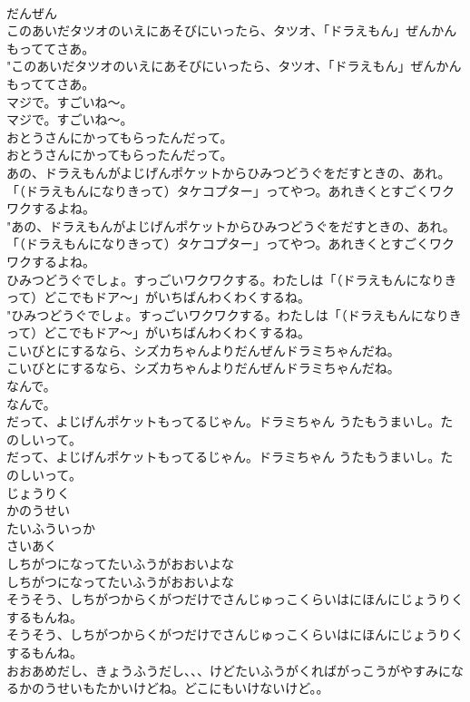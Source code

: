 \documentclass[8pt]{extreport}
\begin{document}
\begin{CJK}{UTF8}{min}
\\	だんぜん
\\	このあいだタツオのいえにあそびにいったら、タツオ、「ドラえもん」ぜんかんもっててさあ。	
\\	"このあいだタツオのいえにあそびにいったら、タツオ、「ドラえもん」ぜんかんもっててさあ。 
\\	マジで。すごいね～。	
\\	マジで。すごいね～。 
\\	おとうさんにかってもらったんだって。	
\\	おとうさんにかってもらったんだって。 
\\	あの、ドラえもんがよじげんポケットからひみつどうぐをだすときの、あれ。「（ドラえもんになりきって）タケコプター」ってやつ。あれきくとすごくワクワクするよね。	
\\	"あの、ドラえもんがよじげんポケットからひみつどうぐをだすときの、あれ。「（ドラえもんになりきって）タケコプター」ってやつ。あれきくとすごくワクワクするよね。 
\\	ひみつどうぐでしょ。すっごいワクワクする。わたしは「（ドラえもんになりきって）どこでもドア～」がいちばんわくわくするね。	
\\	"ひみつどうぐでしょ。すっごいワクワクする。わたしは「（ドラえもんになりきって）どこでもドア～」がいちばんわくわくするね。 
\\	こいびとにするなら、シズカちゃんよりだんぜんドラミちゃんだね。	
\\	こいびとにするなら、シズカちゃんよりだんぜんドラミちゃんだね。 
\\	なんで。	
\\	なんで。 
\\	だって、よじげんポケットもってるじゃん。ドラミちゃん うたもうまいし。たのしいって。	
\\	だって、よじげんポケットもってるじゃん。ドラミちゃん うたもうまいし。たのしいって。 
\\	じょうりく
\\	かのうせい
\\	たいふういっか
\\	さいあく
\\	しちがつになってたいふうがおおいよな	
\\	しちがつになってたいふうがおおいよな 
\\	そうそう、しちがつからくがつだけでさんじゅっこくらいはにほんにじょうりくするもんね。	
\\	そうそう、しちがつからくがつだけでさんじゅっこくらいはにほんにじょうりくするもんね。 
\\	おおあめだし、きょうふうだし、、、けどたいふうがくればがっこうがやすみになるかのうせいもたかいけどね。どこにもいけないけど。。	

\end{CJK}
\end{document}
